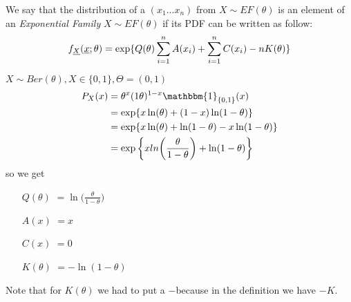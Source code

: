 \begin{defi}
	We say that the distribution of a \rs $(x_1...x_n)$ from $X\sim EF(\theta)$ is an element of an \textit{Exponential Family}	$X\sim EF(\theta)$ if its PDF can be written as follow:
	$$f_{\underline X}(\underline{x};\theta)=\exp \{ Q(\theta)\sum_{i=1}^{n}A(x_i)+ \sum_{i=1}^{n} C(x_i) -nK(\theta) \}$$
\end{defi}
\begin{eg}
	$X\sim Ber(\theta),X\in\{0,1\}, \Theta=(0,1)$
	\[
	\begin{split}
	P_X(x)
	&=\theta^x (1\theta)^{1-x}\mathbbm{1}_{\{0,1\}}(x)\\
	&=\exp\{x\ln(\theta)+(1-x)\ln(1-\theta)  \}\\
	&=\exp\{x\ln(\theta)+\ln(1-\theta)-x\ln(1-\theta)  \}\\
	&=\exp\bigg\{xln{\bigg(\frac{\theta}{1-\theta}\bigg)}+\ln(1-\theta)\bigg\}
	\end{split}
	\]
	so we get 
	\begin{itemize}
		\item[$Q(\theta)$]$=\ln\bigg( \frac{\theta}{1-\theta} \bigg)$
		\item[$A(x)$]$=x$
		\item[$C(x)$]$=0$
		\item[$K(\theta)$]$=-\ln(1-\theta)$
	\end{itemize}
	Note that for $K(\theta)$ we had to put a $-$because in the definition we have $-K$.
\end{eg}

